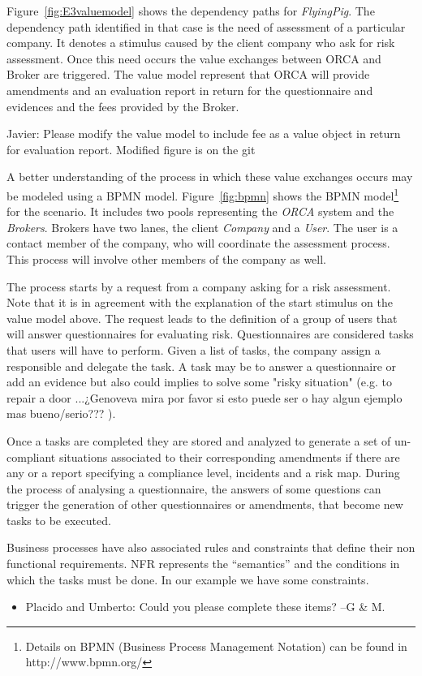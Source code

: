 Figure~\ref{fig:E3valuemodel} shows the dependency paths for \textsl{FlyingPig}. The dependency path identified in that case is the need of assessment of a particular company. It denotes a stimulus caused by the client company who ask for risk assessment. Once this need occurs the value exchanges between ORCA and Broker are triggered. The value model represent that ORCA will provide amendments and an evaluation report in return for the questionnaire and evidences and the fees provided by the Broker. 

{\color{blue} Javier: Please modify the value model to include fee as a value object in return for evaluation report. Modified figure is on the git}

A better understanding of the process in which these value exchanges occurs may be modeled using a BPMN model. Figure~\ref{fig:bpmn} shows the BPMN model\footnote{Details on BPMN (Business Process Management Notation) can be found in http://www.bpmn.org/} for the scenario. It includes two pools representing the \textsl{ORCA} system and the \textsl{Brokers}. Brokers have two lanes, the client \textsl{Company} and a \textsl{User}. The user is a contact member of the company, who will coordinate the assessment process. This process will involve other members of the company as well.

The process starts by a request from a company asking for a risk assessment. Note that it is in agreement with the explanation of the start stimulus on the value model above. The request leads to the definition of a group of users that will answer questionnaires for evaluating risk. Questionnaires are considered tasks that users will have to perform. Given a list of tasks, the company assign a responsible and delegate the task. A task may be to answer a questionnaire or add an evidence but also could implies to solve some "risky situation" (e.g. to repair a door {\color{blue} ...¿Genoveva mira por favor si esto puede ser o hay algun ejemplo mas bueno/serio???} ).

Once a tasks are completed they are stored and analyzed to generate a set of un-compliant situations associated to their corresponding amendments if there are any or a report specifying a compliance level, incidents and a risk map.
During the process of analysing a questionnaire, the answers of some questions can trigger the generation of other questionnaires or amendments, that become new tasks to be executed.  

Business processes have also associated rules and constraints that define their non functional requirements.
NFR represents the ``semantics'' and the conditions in which the tasks must be done.
In our example we have some constraints.
\begin{itemize}
\item {\color{magenta} Placido and Umberto: Could you please complete these items? --G \& M.}
\end{itemize}

